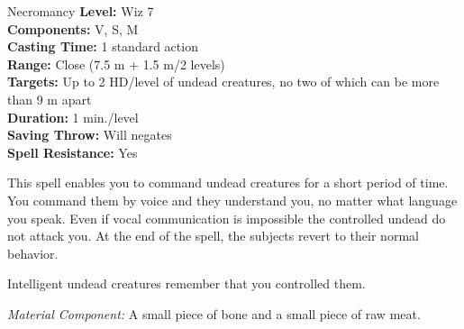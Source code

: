 {Necromancy}
{
	\textbf{Level:}
	Wiz 7\\
	\textbf{Components:}
	V, S, M\\
	\textbf{Casting Time:}
	1 standard action\\
	\textbf{Range:}
	Close (7.5 m + 1.5 m/2 levels)\\
	\textbf{Targets:}
	Up to 2 HD/level of undead creatures, no two of which can be more than 9 m apart\\
	\textbf{Duration:}
	1 min./level\\
	\textbf{Saving Throw:}
	Will negates\\
	\textbf{Spell Resistance:}
	Yes\\
}
{
	This spell enables you to command undead creatures for a short period of time. You command them by voice and they understand you, no matter what language you speak. Even if vocal communication is impossible the controlled undead do not attack you. At the end of the spell, the subjects revert to their normal behavior.

	Intelligent undead creatures remember that you controlled them.

	\textit{Material Component:}
	A small piece of bone and a small piece of raw meat.

}
